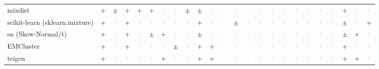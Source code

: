 \documentclass[10pt,a4paper]{article}
\begin{document}
\begin{landscape}
{\begin{longtable}{@{}l *{23}{c}@{}}
mixdist & \cellcolor{yes!35}+ & \cellcolor{part!45}$\pm$ & \cellcolor{yes!35}+ & \cellcolor{yes!35}+ & \cellcolor{yes!35}+ & \textcolor{gray}{·} & \textcolor{gray}{·} & \cellcolor{part!45}$\pm$ & \cellcolor{part!45}$\pm$ & \textcolor{gray}{·} & \textcolor{gray}{·} & \textcolor{gray}{·} & \textcolor{gray}{·} & \textcolor{gray}{·} & \textcolor{gray}{·} & \textcolor{gray}{·} & \textcolor{gray}{·} & \textcolor{gray}{·} & \textcolor{gray}{·} & \textcolor{gray}{·} & \cellcolor{yes!35}+ & \textcolor{gray}{·} & \textcolor{gray}{·} \\
scikit-learn (sklearn.mixture) & \cellcolor{yes!35}+ & \textcolor{gray}{·} & \cellcolor{yes!35}+ & \textcolor{gray}{·} & \textcolor{gray}{·} & \textcolor{gray}{·} & \textcolor{gray}{·} & \textcolor{gray}{·} & \cellcolor{yes!35}+ & \textcolor{gray}{·} & \textcolor{gray}{·} & \cellcolor{part!45}$\pm$ & \textcolor{gray}{·} & \textcolor{gray}{·} & \textcolor{gray}{·} & \textcolor{gray}{·} & \textcolor{gray}{·} & \textcolor{gray}{·} & \textcolor{gray}{·} & \textcolor{gray}{·} & \cellcolor{part!45}$\pm$ & \textcolor{gray}{·} & \cellcolor{yes!35}+ \\
sn (Skew-Normal/t) & \cellcolor{yes!35}+ & \textcolor{gray}{·} & \cellcolor{yes!35}+ & \textcolor{gray}{·} & \cellcolor{part!45}$\pm$ & \cellcolor{yes!35}+ & \textcolor{gray}{·} & \textcolor{gray}{·} & \cellcolor{part!45}$\pm$ & \textcolor{gray}{·} & \textcolor{gray}{·} & \textcolor{gray}{·} & \textcolor{gray}{·} & \textcolor{gray}{·} & \textcolor{gray}{·} & \textcolor{gray}{·} & \textcolor{gray}{·} & \textcolor{gray}{·} & \textcolor{gray}{·} & \textcolor{gray}{·} & \cellcolor{part!45}$\pm$ & \cellcolor{yes!35}+ & \textcolor{gray}{·} \\
EMCluster & \cellcolor{yes!35}+ & \textcolor{gray}{·} & \cellcolor{yes!35}+ & \textcolor{gray}{·} & \textcolor{gray}{·} & \textcolor{gray}{·} & \cellcolor{part!45}$\pm$ & \textcolor{gray}{·} & \cellcolor{yes!35}+ & \cellcolor{yes!35}+ & \textcolor{gray}{·} & \textcolor{gray}{·} & \textcolor{gray}{·} & \textcolor{gray}{·} & \textcolor{gray}{·} & \textcolor{gray}{·} & \textcolor{gray}{·} & \textcolor{gray}{·} & \textcolor{gray}{·} & \textcolor{gray}{·} & \cellcolor{yes!35}+ & \textcolor{gray}{·} & \textcolor{gray}{·} \\
teigen & \cellcolor{yes!35}+ & \textcolor{gray}{·} & \textcolor{gray}{·} & \textcolor{gray}{·} & \textcolor{gray}{·} & \cellcolor{yes!35}+ & \textcolor{gray}{·} & \textcolor{gray}{·} & \cellcolor{yes!35}+ & \cellcolor{yes!35}+ & \textcolor{gray}{·} & \textcolor{gray}{·} & \textcolor{gray}{·} & \textcolor{gray}{·} & \textcolor{gray}{·} & \textcolor{gray}{·} & \textcolor{gray}{·} & \textcolor{gray}{·} & \textcolor{gray}{·} & \textcolor{gray}{·} & \cellcolor{yes!35}+ & \cellcolor{yes!35}+ & \textcolor{gray}{·} \\

\end{longtable}}
\end{landscape}
\end{document}
